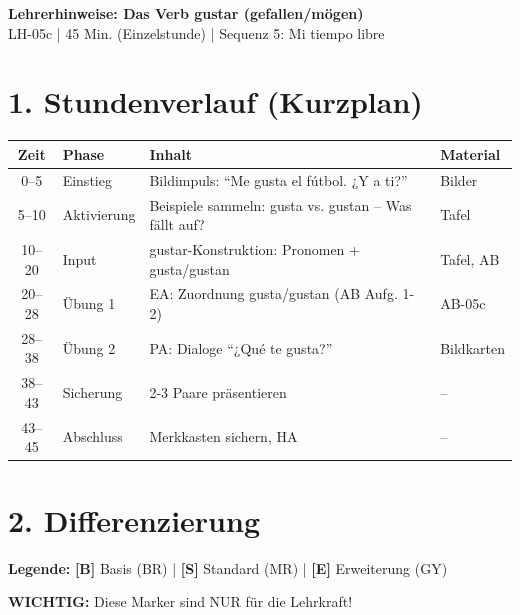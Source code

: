 \documentclass[11pt, a4paper]{article}
\newcommand{\fachfarbe}{spanisch}
\newcommand{\thema}{Das Verb gustar (gefallen/mögen)}
\newcommand{\sequenz}{05}
\newcommand{\block}{c}
\newcommand{\dauer}{45 Min. (Einzelstunde)}
\newcommand{\B}{\textcolor{basis}{\textbf{[B]}}}
\newcommand{\Std}{\textcolor{standard}{\textbf{[S]}}}
\newcommand{\E}{\textcolor{erweiterung}{\textbf{[E]}}}
\begin{document}
\begin{center}
    {\Large\bfseries\textcolor{\fachfarbe}{Lehrerhinweise: \thema}}\\[0.3em]
    {\normalsize LH-\sequenz\block{} | \dauer{} | Sequenz 5: Mi tiempo libre}
\end{center}

\vspace{10pt}


\section*{1. Stundenverlauf (Kurzplan)}

\begin{tabularx}{\textwidth}{|c|l|X|l|}
\hline
\textbf{Zeit} & \textbf{Phase} & \textbf{Inhalt} & \textbf{Material} \\
\hline
0--5 & Einstieg & Bildimpuls: ``Me gusta el fútbol. ¿Y a ti?'' & Bilder \\
\hline
5--10 & Aktivierung & Beispiele sammeln: gusta vs. gustan -- Was fällt auf? & Tafel \\
\hline
10--20 & Input & gustar-Konstruktion: Pronomen + gusta/gustan & Tafel, AB \\
\hline
20--28 & Übung 1 & EA: Zuordnung gusta/gustan (AB Aufg. 1-2) & AB-05c \\
\hline
28--38 & Übung 2 & PA: Dialoge ``¿Qué te gusta?'' & Bildkarten \\
\hline
38--43 & Sicherung & 2-3 Paare präsentieren & -- \\
\hline
43--45 & Abschluss & Merkkasten sichern, HA & -- \\
\hline
\end{tabularx}


\section*{2. Differenzierung}

\begin{differenzierung}
\textbf{Legende:} \B{} Basis (BR) | \Std{} Standard (MR) | \E{} Erweiterung (GY)

\vspace{0.5em}
\textbf{WICHTIG:} Diese Marker sind NUR für die Lehrkraft!
\end{differenzierung}
\end{document}
